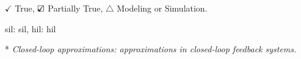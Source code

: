 \begin{table}[t]
\begin{threeparttable}
\begin{tabular}
			\hline
		\end{tabular}
		\begin{tablenotes}
			\footnotesize
			\item{$\checkmark$  True, $\text{\rlap{$\checkmark$}}\square$   Partially True, $\triangle$ Modeling or Simulation.}
			\item{\acrshort{sil}: \Acrlong{sil}, \acrshort{hil}: \Acrlong{hil}}
			\item{* \textit{Closed-loop approximations: approximations in closed-loop feedback systems.}}
		\end{tablenotes}
	\end{threeparttable}
\end{table}
